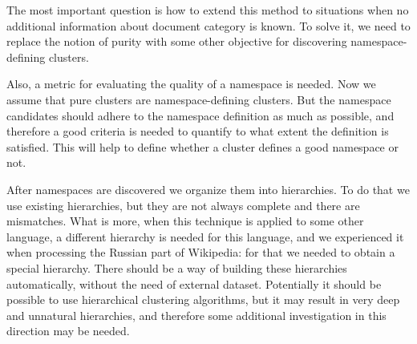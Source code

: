 The most important question is how to extend this method to situations when
no additional information about document category is known. To solve
it, we need to replace the notion of purity with some other objective
for discovering namespace-defining clusters.

Also, a metric for evaluating the quality of a namespace is needed.
Now we assume that pure clusters are namespace-defining clusters. But the namespace
candidates should adhere to the namespace definition as much as possible,
and therefore a good criteria is needed to quantify to what extent the definition
is satisfied. This will help to define whether a cluster defines a good namespace
or not.

After namespaces are discovered we organize them into hierarchies.
To do that we use existing hierarchies, but they are not always complete
and there are mismatches. What is more, when this technique is applied to some
other language, a different hierarchy is needed for this language, and we experienced
it when processing the Russian part of Wikipedia: for that we needed to obtain
a special hierarchy. There should be a way of building these hierarchies
automatically, without the need of external dataset.
Potentially it should be possible to use hierarchical clustering
algorithms, but it may result in very deep and unnatural hierarchies, and
therefore some additional investigation in this direction may be needed.
